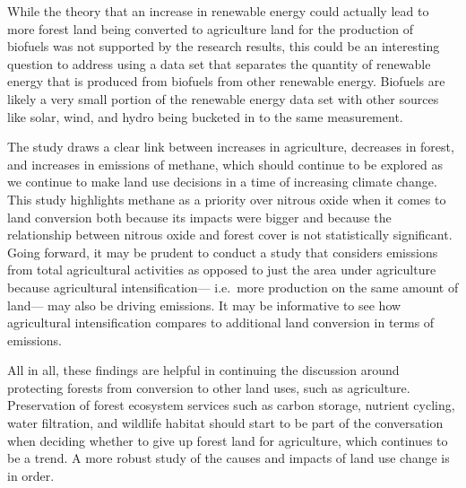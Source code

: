 \documentclass[12pt,]{article}
\begin{document}
While the theory that an increase in renewable energy could actually
lead to more forest land being converted to agriculture land for the
production of biofuels was not supported by the research results, this
could be an interesting question to address using a data set that
separates the quantity of renewable energy that is produced from
biofuels from other renewable energy. Biofuels are likely a very small
portion of the renewable energy data set with other sources like solar,
wind, and hydro being bucketed in to the same measurement.

The study draws a clear link between increases in agriculture, decreases
in forest, and increases in emissions of methane, which should continue
to be explored as we continue to make land use decisions in a time of
increasing climate change. This study highlights methane as a priority
over nitrous oxide when it comes to land conversion both because its
impacts were bigger and because the relationship between nitrous oxide
and forest cover is not statistically significant. Going forward, it may
be prudent to conduct a study that considers emissions from total
agricultural activities as opposed to just the area under agriculture
because agricultural intensification--- i.e.~more production on the same
amount of land--- may also be driving emissions. It may be informative
to see how agricultural intensification compares to additional land
conversion in terms of emissions.

All in all, these findings are helpful in continuing the discussion
around protecting forests from conversion to other land uses, such as
agriculture. Preservation of forest ecosystem services such as carbon
storage, nutrient cycling, water filtration, and wildlife habitat should
start to be part of the conversation when deciding whether to give up
forest land for agriculture, which continues to be a trend. A more
robust study of the causes and impacts of land use change is in order.
\end{document}
